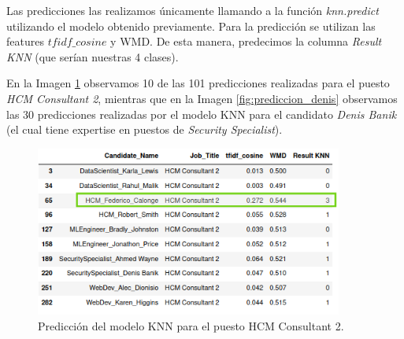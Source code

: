 \documentclass[12pt,a4paper]{article}
\begin{document}
\begin{sloppypar}
Las predicciones las realizamos únicamente llamando a la función \textit{knn.predict} utilizando el modelo obtenido previamente. Para la predicción se utilizan las features $tfidf\_cosine$ y WMD. De esta manera, predecimos la columna \textit{Result KNN} (que serían nuestras 4 clases). 

En la Imagen \ref{fig:Pred_HCM_Consultant_2} observamos 10 de las 101 predicciones realizadas para el puesto \textit{HCM Consultant 2}, mientras que en la Imagen \ref{fig:prediccion_denis} observamos las 30 predicciones realizadas por el modelo KNN para el candidato \textit{Denis Banik} (el cual tiene expertise en puestos de \textit{Security Specialist}).

\begin{figure}[H]   
\centering
\includegraphics[width=0.9\textwidth]{images/implementacion_5/Pred_HCM_Consultant_2.png}
\caption{Predicción del modelo KNN para el puesto HCM Consultant 2.}
\label{fig:Pred_HCM_Consultant_2}
\end{figure}


\end{sloppypar}
\end{document}
